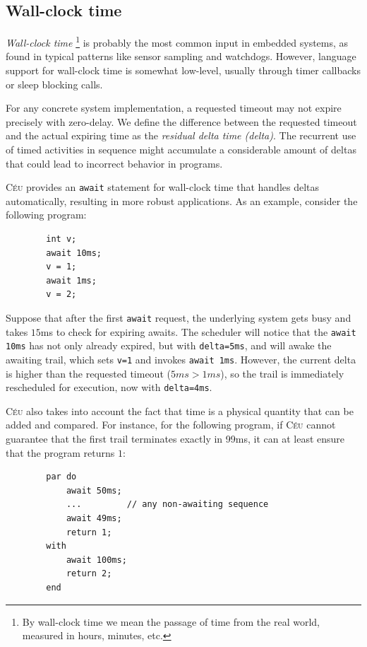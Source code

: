 \documentclass[11pt,a4paper]{article}
\newcommand{\2}{\;\;}
\newcommand{\5}{\;\;\;\;\;}
\newcommand{\CEU}{\textsc{C\'{e}u}}
\newcommand{\code}[1] {{\small{\texttt{#1}}}}
\begin{document}
\subsection{Wall-clock time}
\label{sec:ceu:time}

\emph{Wall-clock time}%
\footnote{
By wall-clock time we mean the passage of time from the real world, measured in 
hours, minutes, etc.
}
is probably the most common input in embedded systems, as found in typical 
patterns like sensor sampling and watchdogs.
However, language support for wall-clock time is somewhat low-level, usually 
through timer callbacks or sleep blocking calls.

For any concrete system implementation, a requested timeout may not expire 
precisely with zero-delay.
We define the difference between the requested timeout and the actual expiring 
time as the \emph{residual delta time (delta)}.
The recurrent use of timed activities in sequence might accumulate a 
considerable amount of deltas that could lead to incorrect behavior in 
programs.

\CEU{} provides an \code{await} statement for wall-clock time that handles 
deltas automatically, resulting in more robust applications.
As an example, consider the following program:
{\small
\begin{verbatim}
        int v;
        await 10ms;
        v = 1;
        await 1ms;
        v = 2;
    \end{verbatim}
}
Suppose that after the first \code{await} request, the underlying system gets 
busy and takes $15$ms to check for expiring awaits.
The scheduler will notice that the \code{await 10ms} has not only already 
expired, but with \code{delta=5ms}, and will awake the awaiting trail, which 
sets \code{v=1} and invokes \code{await 1ms}.
However, the current delta is higher than the requested timeout ($5ms > 1ms$), 
so the trail is immediately rescheduled for execution, now with 
\code{delta=4ms}.

\CEU{} also takes into account the fact that time is a physical quantity that 
can be added and compared.
For instance, for the following program, if \CEU{} cannot guarantee that the 
first trail terminates exactly in 99ms, it can at least ensure that the program 
returns $1$:

{\small
\begin{verbatim}
        par do
            await 50ms;
            ...         // any non-awaiting sequence
            await 49ms;
            return 1;
        with
            await 100ms;
            return 2;
        end
\end{verbatim}
}
\end{document}
